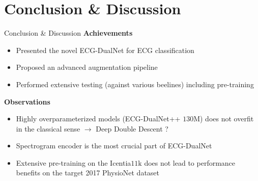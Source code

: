 \section{Conclusion \& Discussion}
\begin{frame}{Conclusion \& Discussion}
    \textbf{Achievements}
    \begin{itemize}
        \item Presented the novel ECG-DualNet for ECG classification
        \item Proposed an advanced augmentation pipeline
        \item Performed extensive testing (against various beelines) including pre-training
    \end{itemize}
    \pause
    \textbf{Observations}
    \begin{itemize}
        \item Highly overparameterized models (ECG-DualNet++ $130\si{\mega}$) does not overfit in the classical sense $\to$ Deep Double Descent \cite{Nakkiran2020} ?
        \item Spectrogram encoder is the most crucial part of ECG-DualNet
        \item Extensive pre-training on the Icentia$11\si{\kilo}$ does not lead to performance benefits on the target 2017 PhysioNet dataset
    \end{itemize}
\end{frame}